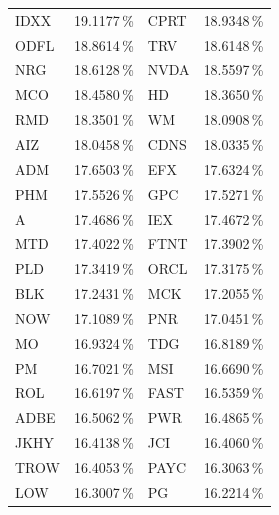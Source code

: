 \begin{longtable}{l c | l c}
    IDXX   & 19.1177\,\%            & CPRT   & 18.9348\,\%                                   \\
    ODFL   & 18.8614\,\%            & TRV    & 18.6148\,\%                                   \\
    NRG    & 18.6128\,\%            & NVDA   & 18.5597\,\%                                   \\
    MCO    & 18.4580\,\%            & HD     & 18.3650\,\%                                   \\
    RMD    & 18.3501\,\%            & WM     & 18.0908\,\%                                   \\
    AIZ    & 18.0458\,\%            & CDNS   & 18.0335\,\%                                   \\
    ADM    & 17.6503\,\%            & EFX    & 17.6324\,\%                                   \\
    PHM    & 17.5526\,\%            & GPC    & 17.5271\,\%                                   \\
    A      & 17.4686\,\%            & IEX    & 17.4672\,\%                                   \\
    MTD    & 17.4022\,\%            & FTNT   & 17.3902\,\%                                   \\
    PLD    & 17.3419\,\%            & ORCL   & 17.3175\,\%                                   \\
    BLK    & 17.2431\,\%            & MCK    & 17.2055\,\%                                   \\
    NOW    & 17.1089\,\%            & PNR    & 17.0451\,\%                                   \\
    MO     & 16.9324\,\%            & TDG    & 16.8189\,\%                                   \\
    PM     & 16.7021\,\%            & MSI    & 16.6690\,\%                                   \\
    ROL    & 16.6197\,\%            & FAST   & 16.5359\,\%                                   \\
    ADBE   & 16.5062\,\%            & PWR    & 16.4865\,\%                                   \\
    JKHY   & 16.4138\,\%            & JCI    & 16.4060\,\%                                   \\
    TROW   & 16.4053\,\%            & PAYC   & 16.3063\,\%                                   \\
    LOW    & 16.3007\,\%            & PG     & 16.2214\,\%                                   \\

\end{longtable}
